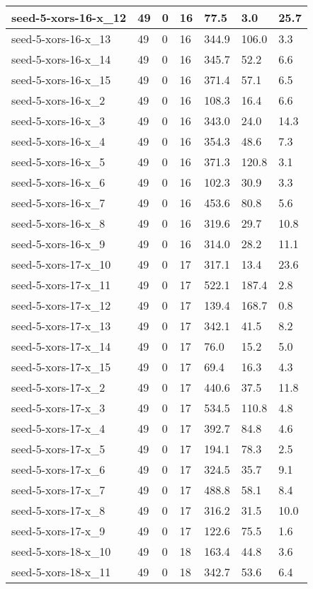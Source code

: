 \begin{scriptsize}
\begin{longtable}{|p{5cm}|l|l|l|l|l|l|}
seed-5-xors-16-x\_12&49&0&16&77.5&3.0&25.7 \\ \hline 
seed-5-xors-16-x\_13&49&0&16&344.9&106.0&3.3 \\ \hline 
seed-5-xors-16-x\_14&49&0&16&345.7&52.2&6.6 \\ \hline 
seed-5-xors-16-x\_15&49&0&16&371.4&57.1&6.5 \\ \hline 
seed-5-xors-16-x\_2&49&0&16&108.3&16.4&6.6 \\ \hline 
seed-5-xors-16-x\_3&49&0&16&343.0&24.0&14.3 \\ \hline 
seed-5-xors-16-x\_4&49&0&16&354.3&48.6&7.3 \\ \hline 
seed-5-xors-16-x\_5&49&0&16&371.3&120.8&3.1 \\ \hline 
seed-5-xors-16-x\_6&49&0&16&102.3&30.9&3.3 \\ \hline 
seed-5-xors-16-x\_7&49&0&16&453.6&80.8&5.6 \\ \hline 
seed-5-xors-16-x\_8&49&0&16&319.6&29.7&10.8 \\ \hline 
seed-5-xors-16-x\_9&49&0&16&314.0&28.2&11.1 \\ \hline 
seed-5-xors-17-x\_10&49&0&17&317.1&13.4&23.6 \\ \hline 
seed-5-xors-17-x\_11&49&0&17&522.1&187.4&2.8 \\ \hline 
seed-5-xors-17-x\_12&49&0&17&139.4&168.7&0.8 \\ \hline 
seed-5-xors-17-x\_13&49&0&17&342.1&41.5&8.2 \\ \hline 
seed-5-xors-17-x\_14&49&0&17&76.0&15.2&5.0 \\ \hline 
seed-5-xors-17-x\_15&49&0&17&69.4&16.3&4.3 \\ \hline 
seed-5-xors-17-x\_2&49&0&17&440.6&37.5&11.8 \\ \hline 
seed-5-xors-17-x\_3&49&0&17&534.5&110.8&4.8 \\ \hline 
seed-5-xors-17-x\_4&49&0&17&392.7&84.8&4.6 \\ \hline 
seed-5-xors-17-x\_5&49&0&17&194.1&78.3&2.5 \\ \hline 
seed-5-xors-17-x\_6&49&0&17&324.5&35.7&9.1 \\ \hline 
seed-5-xors-17-x\_7&49&0&17&488.8&58.1&8.4 \\ \hline 
seed-5-xors-17-x\_8&49&0&17&316.2&31.5&10.0 \\ \hline 
seed-5-xors-17-x\_9&49&0&17&122.6&75.5&1.6 \\ \hline 
seed-5-xors-18-x\_10&49&0&18&163.4&44.8&3.6 \\ \hline 
seed-5-xors-18-x\_11&49&0&18&342.7&53.6&6.4 \\ \hline 

\end{longtable}
\end{scriptsize}
